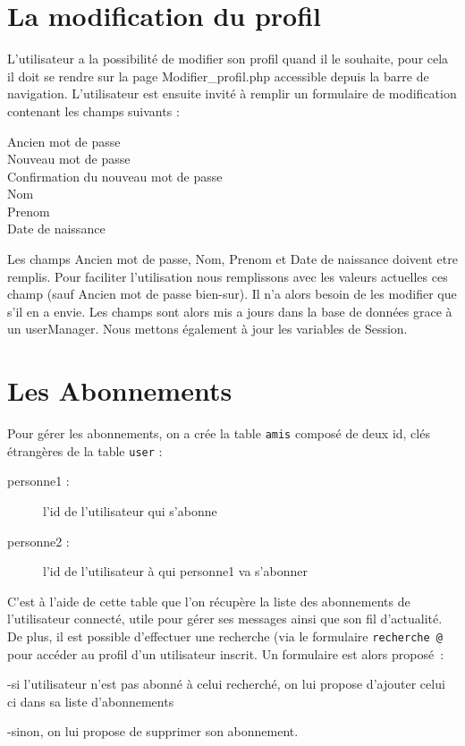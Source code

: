 \documentclass[a4paper, 12pt]{article}
\begin{document}
\section{La modification du profil}
L'utilisateur a la possibilité de modifier son profil quand il le souhaite, pour cela il doit se rendre sur la page Modifier\_profil.php accessible depuis la barre de navigation.
L'utilisateur est ensuite invité à remplir un formulaire de modification contenant les champs suivants :
\begin{description}
\item[Ancien mot de passe]
\item[Nouveau mot de passe]
\item[Confirmation du nouveau mot de passe]
\item[Nom]
\item[Prenom]
\item[Date de naissance]
\end{description}
Les champs Ancien mot de passe, Nom, Prenom et Date de naissance doivent etre remplis. Pour faciliter l'utilisation nous remplissons avec les valeurs actuelles ces champ (sauf Ancien mot de passe bien-sur).
Il n'a alors besoin de les modifier que s'il en a envie. Les champs sont alors mis a jours dans la base de données grace à un userManager. Nous mettons également à jour les variables de Session.



\section{Les Abonnements}	

Pour gérer les abonnements, on a crée la table \texttt{amis} composé de deux id, clés étrangères de la table \texttt{user} :
\begin{description}
\item[personne1 :] l’id de l’utilisateur qui s’abonne
\item[personne2 :] l’id de l’utilisateur à qui personne1 va s’abonner
\end{description}
C’est à l’aide de cette table que l’on récupère la liste des abonnements de l’utilisateur connecté, utile pour gérer ses messages ainsi que son fil d’actualité.
De plus, il est possible d’effectuer une recherche (via le formulaire \texttt{recherche @} pour accéder au profil d’un utilisateur inscrit. Un formulaire est alors proposé :
\begin{description}
\item  -si l’utilisateur n’est pas abonné à celui recherché, on lui propose d’ajouter celui ci dans sa liste d’abonnements
\item -sinon, on lui propose de supprimer son abonnement.
\end{description}
\end{document}
